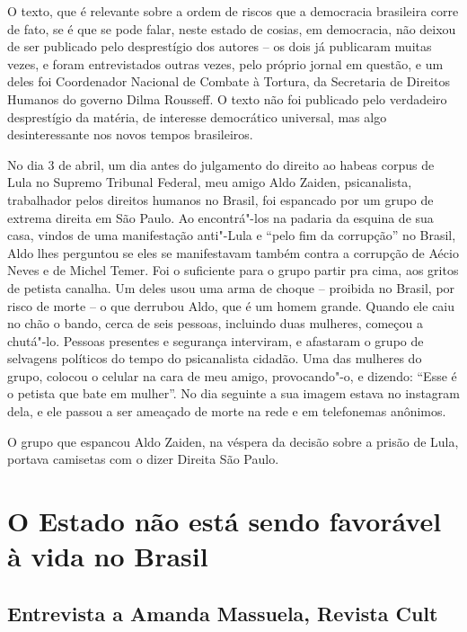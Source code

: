 O texto, que é relevante sobre a ordem de riscos que a democracia
brasileira corre de fato, se é que se pode falar, neste estado de
cosias, em democracia, não deixou de ser publicado pelo desprestígio dos
autores -- os dois já publicaram muitas vezes, e foram entrevistados outras
vezes, pelo próprio jornal em questão, e um deles foi Coordenador
Nacional de Combate à Tortura, da Secretaria de Direitos Humanos do
governo Dilma Rousseff. O texto não foi publicado pelo verdadeiro
desprestígio da matéria, de interesse democrático universal, mas algo
desinteressante nos novos tempos brasileiros.

\begin{center}
\end{center}

No dia 3 de abril, um dia antes do julgamento do direito ao habeas
corpus de Lula no Supremo Tribunal Federal, meu amigo Aldo Zaiden,
psicanalista, trabalhador pelos direitos humanos no Brasil, foi
espancado por um grupo de extrema direita em São Paulo. Ao encontrá"-los
na padaria da esquina de sua casa, vindos de uma manifestação anti"-Lula
e ``pelo fim da corrupção'' no Brasil, Aldo lhes perguntou se eles se
manifestavam também contra a corrupção de Aécio Neves e de Michel Temer.
Foi o suficiente para o grupo partir pra cima, aos gritos de petista
canalha. Um deles usou uma arma de choque -- proibida no Brasil, por
risco de morte -- o que derrubou Aldo, que é um homem grande. Quando ele
caiu no chão o bando, cerca de seis pessoas, incluindo duas
mulheres, começou a chutá"-lo. Pessoas presentes e segurança interviram, e
afastaram o grupo de selvagens políticos do tempo do psicanalista
cidadão. Uma das mulheres do grupo, colocou o celular na cara de meu
amigo, provocando"-o, e dizendo: ``Esse é o petista que bate em mulher''.
No dia seguinte a sua imagem estava no instagram dela, e ele passou a
ser ameaçado de morte na rede e em telefonemas anônimos.

O grupo que espancou Aldo Zaiden, na véspera da decisão sobre a prisão
de Lula, portava camisetas com o dizer Direita São Paulo.

\chapter{O Estado não está sendo favorável à vida no Brasil}


\section{Entrevista a Amanda Massuela, Revista Cult}

